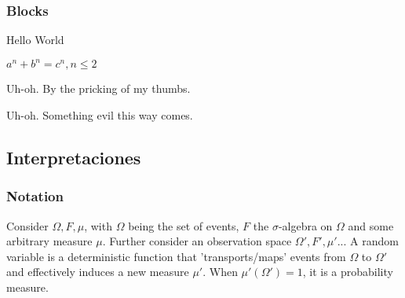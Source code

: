 \documentclass{beamer}
\begin{document}
%
%
%
%
%
%



\begin{frame}
\frametitle{Blocks}
\begin{definition}[Greetings]
Hello World
\end{definition}

\begin{theorem}
$a^n + b^n = c^n, n \leq 2$
\end{theorem}

\begin{alertblock}{Uh-oh.}
By the pricking of my thumbs.
\end{alertblock}

\begin{exampleblock}{Uh-oh.}
Something evil this way comes.
\end{exampleblock}

\end{frame}

\subsection{Interpretaciones}


\begin{frame}
	\frametitle{Notation}
	\begin{definition}
		Consider $\Omega, F, \mu$, with $\Omega$ being the set of events, $F$ the $\sigma$-algebra on $\Omega$ and some arbitrary measure $\mu$. Further consider an observation space $\Omega', F', \mu'$... A random variable is a deterministic function that 'transports/maps' events from $\Omega$ to $\Omega'$ and effectively induces a new measure $\mu'$. When $\mu'(\Omega') = 1$, it is a probability measure.

	\end{definition}
\end{frame}
\end{document}
